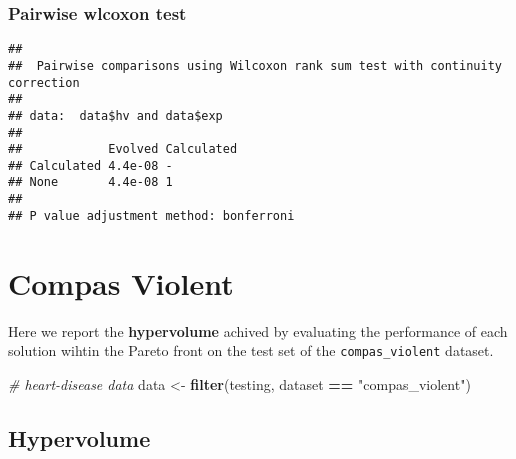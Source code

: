 \documentclass[
]{book}
\newenvironment{Shaded}{\begin{snugshade}}{\end{snugshade}}
\newcommand{\AttributeTok}[1]{\textcolor[rgb]{0.13,0.29,0.53}{#1}}
\newcommand{\CommentTok}[1]{\textcolor[rgb]{0.56,0.35,0.01}{\textit{#1}}}
\newcommand{\ConstantTok}[1]{\textcolor[rgb]{0.56,0.35,0.01}{#1}}
\newcommand{\FunctionTok}[1]{\textcolor[rgb]{0.13,0.29,0.53}{\textbf{#1}}}
\newcommand{\NormalTok}[1]{#1}
\newcommand{\OtherTok}[1]{\textcolor[rgb]{0.56,0.35,0.01}{#1}}
\newcommand{\SpecialCharTok}[1]{\textcolor[rgb]{0.81,0.36,0.00}{\textbf{#1}}}
\newcommand{\StringTok}[1]{\textcolor[rgb]{0.31,0.60,0.02}{#1}}
\begin{document}
\hypertarget{pairwise-wlcoxon-test-5}{%
\subsection{Pairwise wlcoxon test}\label{pairwise-wlcoxon-test-5}}

\begin{Shaded}
\end{Shaded}

\begin{verbatim}
## 
##  Pairwise comparisons using Wilcoxon rank sum test with continuity correction 
## 
## data:  data$hv and data$exp 
## 
##            Evolved Calculated
## Calculated 4.4e-08 -         
## None       4.4e-08 1         
## 
## P value adjustment method: bonferroni
\end{verbatim}

\hypertarget{compas-violent}{%
\chapter{Compas Violent}\label{compas-violent}}

Here we report the \textbf{hypervolume} achived by evaluating the performance of each solution wihtin the Pareto front on the test set of the \texttt{compas\_violent} dataset.

\begin{Shaded}
\begin{Highlighting}[]
\CommentTok{\# heart{-}disease data}
\NormalTok{data }\OtherTok{\textless{}{-}} \FunctionTok{filter}\NormalTok{(testing, dataset }\SpecialCharTok{==} \StringTok{"compas\_violent"}\NormalTok{)}
\end{Highlighting}
\end{Shaded}

\hypertarget{hypervolume-6}{%
\section{Hypervolume}\label{hypervolume-6}}
\end{document}
